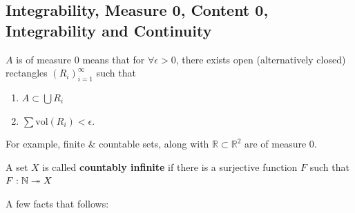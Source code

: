 \documentclass{article}
\numberwithin{equation}{section}
\begin{document}
\subsection{Integrability, Measure 0, Content 0, Integrability and Continuity}
\begin{definition}
    $A$ is of measure $0$ means that for $\forall \epsilon > 0$, there exists open (alternatively closed) rectangles $(R_i)_{i=1}^\infty$ such that
    \begin{enumerate}
        \item $A \subset \bigcup R_i$
        \item $\sum \text{vol}(R_i) < \epsilon.$
    \end{enumerate}
\end{definition}
For example, finite \& countable sets, along with $\mathbb{R} \subset \mathbb{R}^2$ are of measure $0$.
\begin{definition}
    A set $X$ is called \textbf{countably infinite} if there is a surjective function $F$ such that $F: \mathbb{N} \twoheadrightarrow X$
\end{definition}
A few facts that follows:
\end{document}
